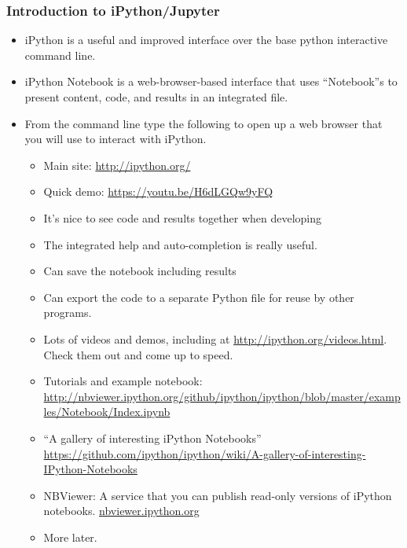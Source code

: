 \begin{frame}[fragile=singleslide]
\frametitle{Introduction to iPython/Jupyter}
\begin{itemize}
  \item iPython is a useful and improved interface over the base python interactive command line.
  \item iPython Notebook is a web-browser-based interface that uses ``Notebook''s to present content, code, and results in an integrated file.
  \item From the command line type the following to open up a web browser that you will use to interact with iPython.
  \begin{itemize}
    \item Main site: \url{http://ipython.org/}
    \item Quick demo: \url{https://youtu.be/H6dLGQw9yFQ}
    \item It's nice to see code and results together when developing
    \item The integrated help and auto-completion is really useful.
    \item Can save the notebook including results
    \item Can export the code to a separate Python file for reuse by other programs.
    \item Lots of videos and demos, including at \url{http://ipython.org/videos.html}.  Check them out and come up to speed.
    \item Tutorials and example notebook:  \url{http://nbviewer.ipython.org/github/ipython/ipython/blob/master/examples/Notebook/Index.ipynb}
    \item ``A gallery of interesting iPython Notebooks'' \url{https://github.com/ipython/ipython/wiki/A-gallery-of-interesting-IPython-Notebooks}
    \item NBViewer:  A service that you can publish read-only versions of iPython notebooks.  \url{nbviewer.ipython.org}
    \item More later.
  \end{itemize}
\end{itemize}
\end{frame}


